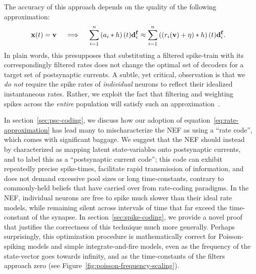 
The accuracy of this approach depends on the quality of the following approximation:
\begin{equation} \label{eq:rate-approximation}
\mathbf{x}(t) = \mathbf{v} \quad \implies \quad \sum_{i=1}^n \left(a_i \ast h \right)(t) \mathbf{d}^{\mathbf{f}}_i \approx \sum_{i=1}^n \left( \left(r_i(\mathbf{v}) + \eta \right) \ast h \right)(t) \mathbf{d}^{\mathbf{f}}_i \text{.}
\end{equation}
In plain words, this presupposes that substituting a filtered spike-train with its correspondingly filtered rates does not change the optimal set of decoders for a target set of postsynaptic currents.
A subtle, yet critical, observation is that we \emph{do not} require the spike rates of \emph{individual} neurons to reflect their idealized instantaneous rates.
Rather, we exploit the fact that filtering and weighting spikes across the \emph{entire} population will satisfy such an approximation~\citep[][pp.~132--136]{eliasmith2003a}.

In section~\ref{sec:psc-coding}, we discuss how our adoption of equation~\ref{eq:rate-approximation} has lead many to mischaracterize the NEF as using a ``rate code'', which comes with significant baggage.
We suggest that the NEF should instead by characterized as mapping latent state-variables onto postsynaptic currents, and to label this as a ``postsynaptic current code''; this code can exhibit repeatedly precise spike-times, facilitate rapid transmission of information, and does not demand excessive pool sizes or long time-constants, contrary to commonly-held beliefs that have carried over from rate-coding paradigms.
In the NEF, individual neurons are free to spike much slower than their ideal rate models, while remaining silent across intervals of time that far exceed the time-constant of the synapse.
In section~\ref{sec:spike-coding}, we provide a novel proof that justifies the correctness of this technique much more generally.
Perhaps surprisingly, this optimization procedure is mathematically correct for Poisson-spiking models and simple integrate-and-fire models, even as the frequency of the state-vector goes towards infinity, and as the time-constants of the filters approach zero (see Figure~\ref{fig:poisson-frequency-scaling}).

